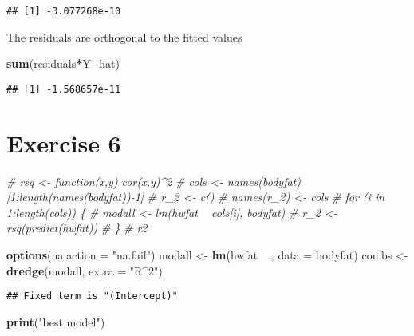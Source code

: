 \documentclass[]{article}
\newenvironment{Shaded}{\begin{snugshade}}{\end{snugshade}}
\newcommand{\CommentTok}[1]{\textcolor[rgb]{0.56,0.35,0.01}{\textit{#1}}}
\newcommand{\DataTypeTok}[1]{\textcolor[rgb]{0.13,0.29,0.53}{#1}}
\newcommand{\KeywordTok}[1]{\textcolor[rgb]{0.13,0.29,0.53}{\textbf{#1}}}
\newcommand{\NormalTok}[1]{#1}
\newcommand{\OperatorTok}[1]{\textcolor[rgb]{0.81,0.36,0.00}{\textbf{#1}}}
\newcommand{\StringTok}[1]{\textcolor[rgb]{0.31,0.60,0.02}{#1}}
\begin{document}
\begin{verbatim}
## [1] -3.077268e-10
\end{verbatim}

The residuals are orthogonal to the fitted values

\begin{Shaded}
\begin{Highlighting}[]
\KeywordTok{sum}\NormalTok{(residuals}\OperatorTok{*}\NormalTok{Y_hat)}
\end{Highlighting}
\end{Shaded}

\begin{verbatim}
## [1] -1.568657e-11
\end{verbatim}

\newpage

\hypertarget{exercise-6}{%
\section{Exercise 6}\label{exercise-6}}

\begin{Shaded}
\begin{Highlighting}[]
\CommentTok{# rsq <- function(x,y) cor(x,y)^2}
\CommentTok{# cols <- names(bodyfat)[1:length(names(bodyfat))-1]}
\CommentTok{# r_2 <- c()}
\CommentTok{# names(r_2) <- cols}
\CommentTok{# for (i in 1:length(cols)) \{}
\CommentTok{#     modall <- lm(hwfat ~ cols[i], bodyfat)}
\CommentTok{#     r_2 <- rsq(predict(hwfat))}
\CommentTok{# \}}
\CommentTok{# r2}
\end{Highlighting}
\end{Shaded}

\begin{Shaded}
\begin{Highlighting}[]
\KeywordTok{options}\NormalTok{(}\DataTypeTok{na.action =} \StringTok{"na.fail"}\NormalTok{)}
\NormalTok{modall <-}\StringTok{ }\KeywordTok{lm}\NormalTok{(hwfat }\OperatorTok{~}\NormalTok{., }\DataTypeTok{data =}\NormalTok{ bodyfat)}
\NormalTok{combs <-}\StringTok{ }\KeywordTok{dredge}\NormalTok{(modall, }\DataTypeTok{extra =} \StringTok{"R^2"}\NormalTok{)}
\end{Highlighting}
\end{Shaded}

\begin{verbatim}
## Fixed term is "(Intercept)"
\end{verbatim}

\begin{Shaded}
\begin{Highlighting}[]
\KeywordTok{print}\NormalTok{(}\StringTok{"best model"}\NormalTok{)}
\end{Highlighting}
\end{Shaded}
\end{document}
